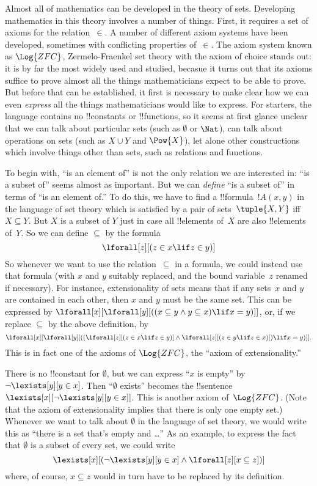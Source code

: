 \documentclass[../../include/open-logic-section]{subfiles}
\begin{document}


Almost all of mathematics can be developed in the theory of sets.
Developing mathematics in this theory involves a number of things.
First, it requires a set of axioms for the relation~$\in$.  A number
of different axiom systems have been developed, sometimes with
conflicting properties of~$\in$. The axiom system known as
$\Log{ZFC}$, Zermelo-Fraenkel set theory with the axiom of choice
stands out: it is by far the most widely used and studied, becasue it
turns out that its axioms suffice to prove almost all the things
mathematicians expect to be able to prove.  But before that can be
established, it first is necessary to make clear how we can even
\emph{express} all the things mathematicians would like to express.
For starters, the language contains no !!{constant}s or !!{function}s,
so it seems at first glance unclear that we can talk about particular
sets (such as $\emptyset$ or $\Nat$), can talk about operations on
sets (such as $X \cup Y$ and $\Pow{X}$), let alone other
constructions which involve things other than sets, such as relations
and functions.

To begin with, ``is an element of'' is not the only relation we are
interested in: ``is a subset of'' seems almost as important.  But we
can \emph{define} ``is a subset of'' in terms of ``is an element of.''
To do this, we have to find a !!{formula}~$!A(x, y)$ in
the language of set theory which is satisfied by a pair of
sets~$\tuple{X, Y}$ iff $X \subseteq Y$.  But $X$ is a subset of $Y$
just in case all !!{element}s of~$X$ are also !!{element}s of~$Y$. So
we can define $\subseteq$ by the formula
\[
\lforall[z][(z \in x \lif z \in y)]
\]
So whenever we want to use the relation~$\subseteq$ in a formula, we
could instead use that formula (with $x$ and $y$ suitably replaced,
and the bound variable~$z$ renamed if necessary).  For instance,
extensionality of sets means that if any sets~$x$ and $y$ are
contained in each other, then $x$ and $y$ must be the same set. This
can be expressed by $\lforall[x][\lforall[y][((x \subseteq y \land y
    \subseteq x) \lif x = y)]]$, or, if we replace $\subseteq$ by the
above definition, by
\[
\lforall[x][\lforall[y][((\lforall[z][(z \in x \lif z \in y)] \land
    \lforall[z][(z \in y \lif z \in x)]) \lif x = y)]].
\]
This is in fact one of the axioms of $\Log{ZFC}$, the ``axiom of
extensionality.''

There is no !!{constant} for $\emptyset$, but we can express ``$x$ is
empty'' by $\lnot \lexists[y][y \in x]$.  Then ``$\emptyset$ exists''
becomes the !!{sentence}~$\lexists[x][\lnot \lexists[y][y \in
    x]]$. This is another axiom of~$\Log{ZFC}$.  (Note that the axiom
of extensionality implies that there is only one empty set.)  Whenever
we want to talk about $\emptyset$ in the language of set theory, we
would write this as ``there is a set that's empty and \dots'' As an
example, to express the fact that $\emptyset$ is a subset of every
set, we could write
\[
\lexists[x][(\lnot\lexists[y][y \in x] \land \lforall[z][x \subseteq
    z])]
\]
where, of course, $x \subseteq z$ would in turn have to be replaced by
its definition.
\end{document}

